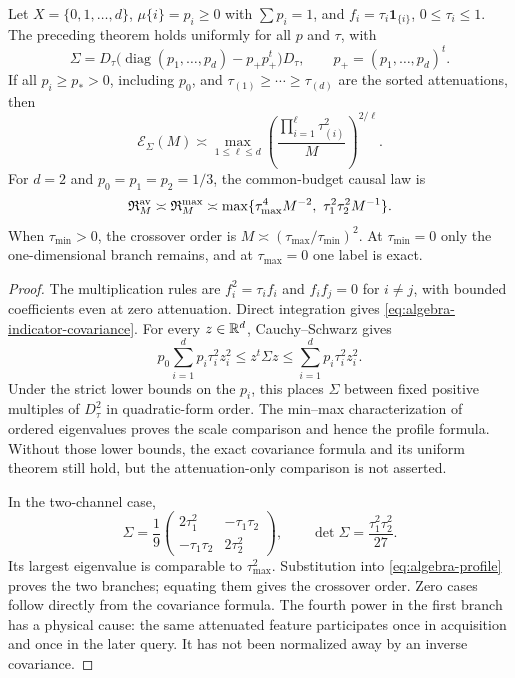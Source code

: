 \begin{corollary}
\label{cor:algebra-attenuation}
Let $X=\{0,1,\ldots,d\}$, $\mu\{i\}=p_i\ge0$ with $\sum p_i=1$,
and $f_i=\tau_i\mathbf1_{\{i\}}$, $0\le\tau_i\le1$.
The preceding theorem holds uniformly for all $p$ and $\tau$, with
\begin{equation}\label{eq:algebra-indicator-covariance}
 \Sigma=D_\tau\bigl(\operatorname{diag}(p_1,\ldots,p_d)-p_+p_+^t\bigr)D_\tau,
 \qquad p_+=(p_1,\ldots,p_d)^t.
\end{equation}
If all $p_i\ge p_*>0$, including $p_0$, and
$\tau_{(1)}\ge\cdots\ge\tau_{(d)}$ are the sorted attenuations, then
\[
 \mathcal E_\Sigma(M)\asymp
 \max_{1\le\ell\le d}
       \left(\frac{\prod_{i=1}^\ell\tau_{(i)}^2}{M}\right)^{2/\ell}.
\]
For $d=2$ and $p_0=p_1=p_2=1/3$, the common-budget causal law is
\begin{equation}\label{eq:algebra-two-channel-law}
 \mathfrak R^{\rm av}_{M}\asymp\mathfrak R^{\rm max}_{M}
 \asymp \max\{\tau_{\max}^4M^{-2},\ \tau_1^2\tau_2^2M^{-1}\}.
\end{equation}
When $\tau_{\min}>0$, the crossover order is
$M\asymp(\tau_{\max}/\tau_{\min})^2$. At $\tau_{\min}=0$
only the one-dimensional branch remains, and at $\tau_{\max}=0$
one label is exact.
\end{corollary}
\begin{proof}
The multiplication rules are $f_i^2=\tau_i f_i$ and $f_if_j=0$
for $i\ne j$, with bounded coefficients even at zero attenuation.
Direct integration gives \eqref{eq:algebra-indicator-covariance}.
For every $z\in\mathbb R^d$, Cauchy--Schwarz gives
\[
 p_0\sum_{i=1}^d p_i\tau_i^2z_i^2
 \le z^t\Sigma z\le\sum_{i=1}^d p_i\tau_i^2z_i^2.
\]
Under the strict lower bounds on the $p_i$, this places $\Sigma$
between fixed positive multiples of $D_\tau^2$ in quadratic-form
order. The min--max characterization of ordered eigenvalues proves
the scale comparison and hence the profile formula. Without those
lower bounds, the exact covariance formula and its uniform theorem
still hold, but the attenuation-only comparison is not asserted.

In the two-channel case,
\[
 \Sigma=\frac19\begin{pmatrix}2\tau_1^2&-\tau_1\tau_2\\
                      -\tau_1\tau_2&2\tau_2^2\end{pmatrix},
 \qquad \det\Sigma=\frac{\tau_1^2\tau_2^2}{27}.
\]
Its largest eigenvalue is comparable to $\tau_{\max}^2$.
Substitution into \eqref{eq:algebra-profile} proves the two branches;
equating them gives the crossover order. Zero cases follow directly
from the covariance formula. The fourth power in the first branch
has a physical cause: the same attenuated feature participates once
in acquisition and once in the later query. It has not been normalized
away by an inverse covariance.
\end{proof}

